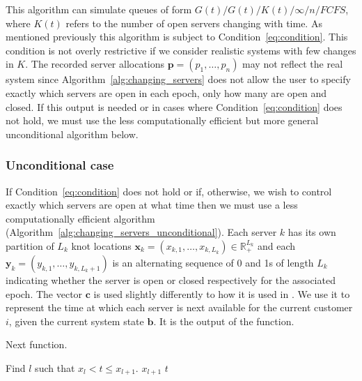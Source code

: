 \documentclass[article]{jss}
\begin{document}
This algorithm can simulate queues of form $G(t)/G(t)/K(t)/\infty/n/\mathit{FCFS}$, where $K(t)$ refers to the number of open servers changing with time. As mentioned previously this algorithm is subject to Condition~\ref{eq:condition}. This condition is not overly restrictive if we consider realistic systems with few changes in $K$. The recorded server allocations $\mathbf{p} = (p_1, \ldots, p_n)$ may not reflect the real system since Algorithm~\ref{alg:changing_servers} does not allow the user to specify exactly which servers are open in each epoch, only how many are open and closed. If this output is needed or in cases where Condition~\ref{eq:condition} does not hold, we must use the less computationally efficient but more general unconditional algorithm below.  

\subsubsection{Unconditional case}

If Condition~\ref{eq:condition} does not hold or if, otherwise, we wish to control exactly which servers are open at what time then we must use a less computationally efficient algorithm (Algorithm~\ref{alg:changing_servers_unconditional}). Each server $k$ has its own partition of $L_k$ knot locations $\mathbf{x}_k = (x_{k,1}, \ldots, x_{k,L_k} ) \in \mathbb{R}^{L_k}_{+}$ and each $\mathbf{y}_k = (y_{k,1}, \ldots, y_{k,L_k+1} )$ is an alternating sequence of 0 and 1s of length $L_k$ indicating whether the server is open or closed respectively for the associated epoch. The vector $\mathbf{c}$ is used slightly differently to how it is used in \citet{sutton_bayesian_2011}. We use it to represent the time at which each server is next available for the current customer $i$, given the current system state $\mathbf{b}$. It is the output of the  function. 

\begin{algorithm}[t!]
\caption{Next function.}
\label{alg:next_fun}
\begin{algorithmic}
\State Find $l$ such that $x_{l} < t \leq x_{l+1}$.
\State \Return $x_{l+1}$
\Else
\State \Return $t$
\EndIf
\EndFunction
\end{algorithmic}
\end{algorithm}
\end{document}
